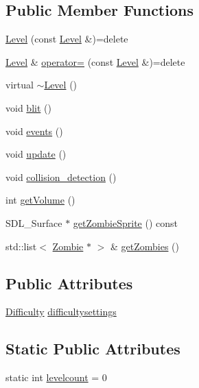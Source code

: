 \subsection*{Public Member Functions}
\begin{DoxyCompactItemize}
\item 
\hyperlink{classLevel_ae03636cc90bd5f178650bd366124cb1c}{Level} (const \hyperlink{classLevel}{Level} \&)=delete
\item 
\hyperlink{classLevel}{Level} \& \hyperlink{classLevel_acbd996c953d3e3436cafddbf476cdba0}{operator=} (const \hyperlink{classLevel}{Level} \&)=delete
\item 
virtual \hyperlink{classLevel_a249eac1e8f19ff44134efa5e986feaca}{$\sim$\-Level} ()
\item 
void \hyperlink{classLevel_aa1f4afede83296a5f90254a1b8c558f3}{blit} ()
\item 
void \hyperlink{classLevel_a099ff502ab97a3c8bcf8511690d734d8}{events} ()
\item 
void \hyperlink{classLevel_a62e412eaad753d2baa2f94239cb80e41}{update} ()
\item 
void \hyperlink{classLevel_a44653e86f4db052e42396b0d4e95cc0a}{collision\-\_\-detection} ()
\item 
int \hyperlink{classLevel_aaf2eebf04cd6fe9343df05d7bd758119}{get\-Volume} ()
\item 
S\-D\-L\-\_\-\-Surface $\ast$ \hyperlink{classLevel_aab6e60626fa71aa9db1161ade94ca442}{get\-Zombie\-Sprite} () const 
\item 
std\-::list$<$ \hyperlink{classZombie}{Zombie} $\ast$ $>$ \& \hyperlink{classLevel_a11472360cfb4e4c6984015d86b5f7a96}{get\-Zombies} ()
\end{DoxyCompactItemize}
\subsection*{Public Attributes}
\begin{DoxyCompactItemize}
\item 
\hyperlink{structLevel_1_1Difficulty}{Difficulty} \hyperlink{classLevel_a940e0830c532595cc4509be6f68f30b9}{difficultysettings}
\end{DoxyCompactItemize}
\subsection*{Static Public Attributes}
\begin{DoxyCompactItemize}
\item 
static int \hyperlink{classLevel_a1af089e10ff0fc446d57277d48709622}{levelcount} = 0
\end{DoxyCompactItemize}
